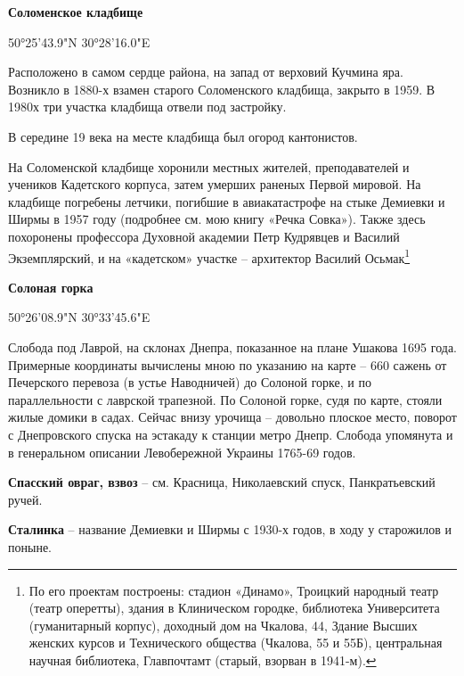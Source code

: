 \textbf{Соломенское кладбище}

50°25'43.9"N 30°28'16.0"E

Расположено в самом сердце района, на запад от верховий Кучмина яра. Возникло в 1880-х взамен старого Соломенского кладбища, закрыто в 1959. В 1980х три участка кладбища отвели под застройку.

В середине 19 века на месте кладбища был огород кантонистов.

На Соломенской кладбище хоронили местных жителей, преподавателей и учеников Кадетского корпуса, затем умерших раненых Первой мировой. На кладбище погребены летчики, погибшие в авиакатастрофе на стыке Демиевки и Ширмы в 1957 году (подробнее см. мою книгу «Речка Совка»). Также здесь похоронены профессора Духовной академии Петр Кудрявцев и Василий Экземплярский, и на «кадетском» участке – архитектор Василий Осьмак\footnote{По его проектам построены: стадион «Динамо», Троицкий народный театр (театр оперетты), здания в Клиническом городке, библиотека Университета (гуманитарный корпус), доходный дом на Чкалова, 44, Здание Высших женских курсов и Технического общества (Чкалова, 55 и 55Б), центральная научная библиотека, Главпочтамт (старый, взорван в 1941-м).}\\

\medskip

\textbf{Солоная горка} 

50°26'08.9"N 30°33'45.6"E

Слобода под Лаврой, на склонах Днепра, показанное на плане Ушакова 1695 года. Примерные координаты вычислены мною по указанию на карте – 660 сажень от Печерского перевоза (в устье Наводничей) до Солоной горке, и по параллельности с лаврской трапезной. По Солоной горке, судя по карте, стояли жилые домики в садах. Сейчас внизу урочища – довольно плоское место, поворот с Днепровского спуска на эстакаду к станции метро Днепр. Слобода упомянута и в генеральном описании Левобережной Украины 1765-69 годов.\\

\medskip

\textbf{Спасский овраг, взвоз} – см. Красница, Николаевский спуск, Панкратьевский ручей.\\

\medskip

\textbf{Сталинка} – название Демиевки и Ширмы с 1930-х годов, в ходу у старожилов и поныне.\\

\medskip


